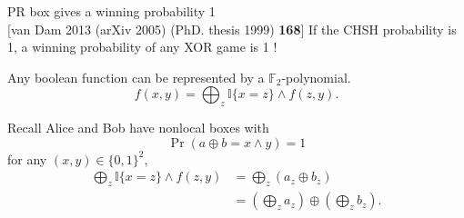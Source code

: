 \documentclass{beamer}
\newcommand\emm[1]{\textcolor{redorange}{{#1}}}
\newcommand\numc[1]{\textcolor{citation}{{\bf #1}}}
\begin{document}
\begin{frame}{PR box gives a winning probability 1\\{\normalsize [van Dam 2013 {\small (arXiv 2005) (PhD. thesis 1999)} \numc{168}]}}
If the CHSH probability is 1, a winning probability of \emm{any XOR game} is \emm{1} !

\vspace{1em}
Any boolean function can be represented by a $\mathbb{F}_2$-polynomial.
\begin{equation*}
f(x,y) = \bigoplus_z \mathbb{I}\{x = z\} \wedge f(z, y).
\end{equation*}


Recall Alice and Bob have nonlocal boxes with
\begin{equation*}
\Pr(a \oplus b = x\wedge y) = 1
\end{equation*}
for any $(x,y)\in\{0,1\}^2$,
%
\begin{align*}
\bigoplus_z \mathbb{I}\{x = z\} \wedge f(z, y)
&= \bigoplus_z (a_z \oplus b_z)\\
&= \left(\bigoplus_z a_z\right) \oplus \left(\bigoplus_z b_z\right).
\end{align*}
\end{frame}
\end{document}
